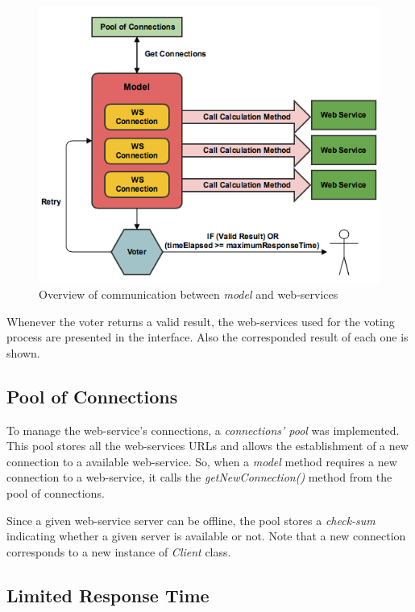     \begin{figure}[H]
        \centering
        \includegraphics[width=\textwidth,height=\textheight,keepaspectratio]{webservice-2.png}
        \caption{Overview of communication between \emph{model} and web-services}
        \label{FILHADAPUTA}     
    \end{figure}
    
    Whenever the voter returns a valid result, the web-services used for the voting process are presented in the interface. Also the corresponded result of each one is shown.
    
\subsection{Pool of Connections}
    
    To manage the web-service's connections, a \emph{connections' pool} was implemented. This pool stores all the web-services URLs and allows the establishment of a new connection to a available web-service. So, when a \emph{model} method requires a new connection to a web-service, it calls the \emph{getNewConnection()} method from the pool of connections.
    
    Since a given web-service server can be offline, the pool stores a \emph{check-sum} indicating whether a given server is available or not. Note that a new connection corresponds to a new instance of \emph{Client} class.

\subsection{Limited Response Time}

